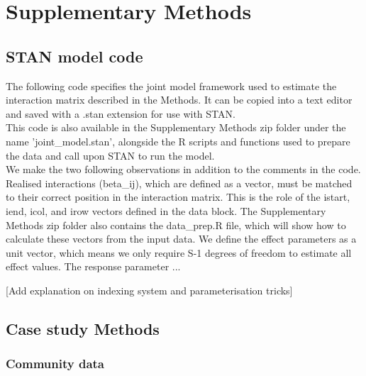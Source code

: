 \documentclass[a4,12pt]{article}
\begin{document}
% 
% 

\newpage

\printbibliography   

\newpage 

\section{Supplementary Methods}
\label{SI:Methods}

    \subsection{STAN model code}
    \label{SI:modelcode}
    The following code specifies the joint model framework used to estimate the interaction matrix described in the Methods. It can be copied into a text editor and saved with a .stan extension for use with STAN. \\

    This code is also available in the Supplementary Methods zip folder under the name 'joint\_model.stan', alongside the R scripts and functions used to prepare the data and call upon STAN to run the model. \\

    We make the two following observations in addition to the comments in the code.
    Realised interactions (beta\_ij), which are defined as a vector,  must be matched to their correct position in the interaction matrix. This is the role of the istart, iend, icol, and irow vectors defined in the data block. The Supplementary Methods zip folder also contains the data\_prep.R file, which will show how to calculate these vectors from the input data. 
    We define the effect parameters as a unit vector, which means we only require S-1 degrees of freedom to estimate all effect values. The response parameter ...

    [Add explanation on indexing system and parameterisation tricks]




    



    \subsection{Case study Methods}
    \label{SI:casestudy}

        \subsubsection{Community data}
\end{document}
